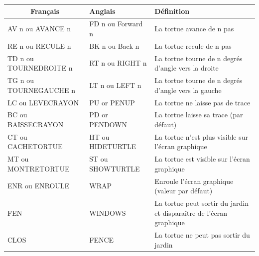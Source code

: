\begin{table}[htb]
\begin{changemargin}{-3cm}{-3cm}
\begin{tabular}{|l|l|l|}
\hline
\multicolumn{1}{|c|}{Français} & Anglais            & Définition                                                                                         \\ \hline
AV n ou AVANCE n               & FD n ou Forward n  & La tortue avance de n pas                                                                          \\ \hline
RE n ou RECULE n               & BK n ou Back n     & La tortue recule de n pas                                                                          \\ \hline
TD n ou TOURNEDROITE n         & RT n ou RIGHT n    & La tortue tourne de n degrés d'angle vers la droite                                                \\ \hline
TG n ou TOURNEGAUCHE n         & LT n ou LEFT n     & La tortue tourne de n degrés d'angle vers la gauche                                                \\ \hline
LC ou LEVECRAYON               & PU or PENUP        & La tortue ne laisse pas de trace                                                                   \\ \hline
BC ou BAISSECRAYON             & PD or PENDOWN      & La tortue laisse sa trace (par défaut)                                                             \\ \hline
CT ou CACHETORTUE              & HT ou HIDETURTLE   & La tortue n'est plus visible sur l'écran graphique                                                 \\ \hline
MT ou MONTRETORTUE             & ST ou SHOWTURTLE   & La tortue est visible sur l'écran graphique                                                        \\ \hline
ENR ou ENROULE                 & WRAP               & Enroule l'écran graphique (valeur par défaut)                                                      \\ \hline
FEN                            & WINDOWS            & La tortue peut sortir du jardin et disparaître de l'écran graphique                                \\ \hline
CLOS                           & FENCE              & La tortue ne peut pas sortir du jardin                                                             \\ \hline

\end{tabular}
\end{changemargin}
\end{table}
